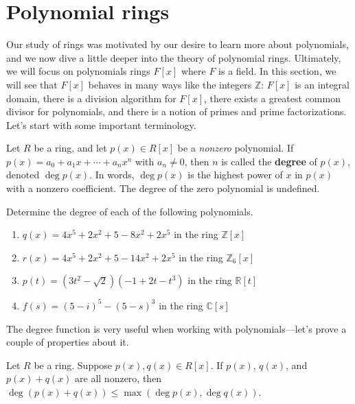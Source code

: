 \section{Polynomial rings}
Our study of rings was motivated by our desire to learn more about polynomials, and we now dive a little deeper into the theory of polynomial rings. Ultimately, we will focus on polynomials rings $F[x]$ where $F$ is a field. In this section, we will see that $F[x]$ behaves in many ways like the integers $\mathbb{Z}$: $F[x]$ is an integral domain, there is a division algorithm for $F[x]$, there exists a greatest common divisor for polynomials, and there is a notion of primes and prime factorizations. 
Let's start with some important terminology.

\begin{definition}
Let $R$ be a ring, and let  $p(x)\in R[x]$ be a \emph{nonzero} polynomial. If $p(x) = a_0 + a_1x + \cdots + a_nx^n$ with $a_n \neq 0$, then $n$ is called the \textbf{degree} of $p(x)$, denoted $\deg p(x)$. In words, $\deg p(x)$ is the highest power of $x$ in $p(x)$ with a nonzero coefficient. The degree of the zero polynomial is undefined.
\end{definition}

\begin{problem}
Determine the degree of each of the following polynomials.
\begin{enumerate}
\item $q(x) = 4x^5 + 2x^2 + 5 -8x^2 +2x^5$ in the ring $\mathbb{Z}[x]$
\item $r(x) = 4x^5 + 2x^2 + 5 -14x^2 +2x^5$ in the ring $\mathbb{Z}_6[x]$
\item $p(t) = (3t^2-\sqrt{2})(-1 + 2t -t^3)$ in the ring $\mathbb{R}[t]$
\item $f(s) = (5-i)^5 - (5-s)^3$ in the ring $\mathbb{C}[s]$
\end{enumerate}
\end{problem}

The degree function is very useful when working with polynomials---let's prove a couple of properties about it. 

\begin{theorem}\label{thm.DegreePolySum}
Let $R$ be a ring. Suppose $p(x), q(x)\in R[x]$. If $p(x)$, $q(x)$, and $p(x) + q(x)$ are all nonzero, then $\deg(p(x) + q(x)) \le \max(\deg p(x),\deg q(x))$.
\end{theorem}

